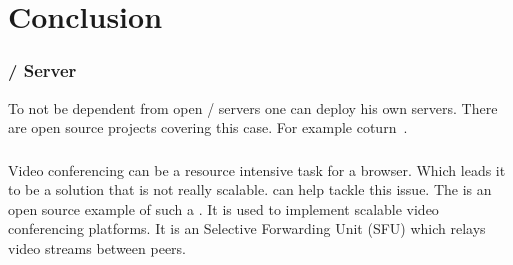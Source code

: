 \clearpage
\chapter{Conclusion}

\subsection{ /  Server}
To not be dependent from open / servers one can deploy his own servers. There are open source projects covering this case. For example coturn~\cite{coturn}.

\subsection{}
Video conferencing can be a resource intensive task for a browser. Which leads it to be a solution that is not really scalable.  can help tackle this issue. The   is an open source example of such a . It is used to implement scalable video conferencing platforms. It is an Selective Forwarding Unit (SFU) which relays video streams between peers.
